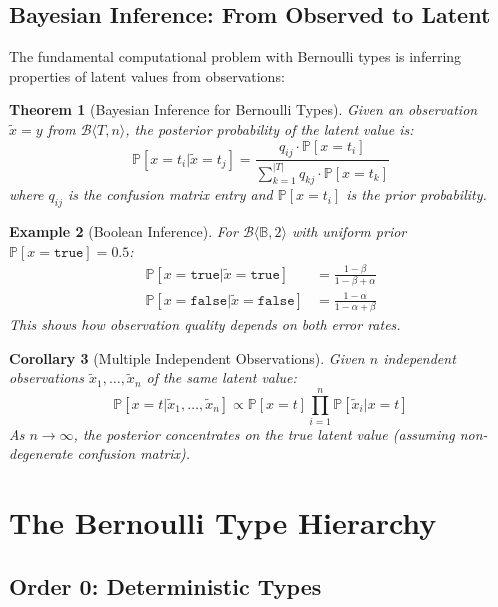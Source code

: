 \documentclass[11pt,final,hidelinks]{article}
\newtheorem{theorem}{Theorem}[section]
\newtheorem{corollary}[theorem]{Corollary}
\newtheorem{example}[theorem]{Example}
\newcommand{\bernoulli}[2]{\mathcal{B}\langle #1, #2 \rangle}
\newcommand{\Bool}{\mathbb{B}}
\newcommand{\True}{\mathtt{true}}
\newcommand{\False}{\mathtt{false}}
\newcommand{\Prob}[1]{\mathbb{P}\left[#1\right]}
\begin{document}
\subsection{Bayesian Inference: From Observed to Latent}

The fundamental computational problem with Bernoulli types is inferring properties of latent values from observations:

\begin{theorem}[Bayesian Inference for Bernoulli Types]
Given an observation $\tilde{x} = y$ from $\bernoulli{T}{n}$, the posterior probability of the latent value is:
\begin{equation}
\Prob{x = t_i | \tilde{x} = t_j} = \frac{q_{ij} \cdot \Prob{x = t_i}}{\sum_{k=1}^{|T|} q_{kj} \cdot \Prob{x = t_k}}
\end{equation}
where $q_{ij}$ is the confusion matrix entry and $\Prob{x = t_i}$ is the prior probability.
\end{theorem}

\begin{example}[Boolean Inference]
For $\bernoulli{\Bool}{2}$ with uniform prior $\Prob{x = \True} = 0.5$:
\begin{align}
\Prob{x = \True | \tilde{x} = \True} &= \frac{1-\beta}{1-\beta + \alpha} \\
\Prob{x = \False | \tilde{x} = \False} &= \frac{1-\alpha}{1-\alpha + \beta}
\end{align}
This shows how observation quality depends on both error rates.
\end{example}

\begin{corollary}[Multiple Independent Observations]
Given $n$ independent observations $\tilde{x}_1, \ldots, \tilde{x}_n$ of the same latent value:
\begin{equation}
\Prob{x = t | \tilde{x}_1, \ldots, \tilde{x}_n} \propto \Prob{x = t} \prod_{i=1}^n \Prob{\tilde{x}_i | x = t}
\end{equation}
As $n \to \infty$, the posterior concentrates on the true latent value (assuming non-degenerate confusion matrix).
\end{corollary}

\section{The Bernoulli Type Hierarchy}

\subsection{Order 0: Deterministic Types}
\end{document}
